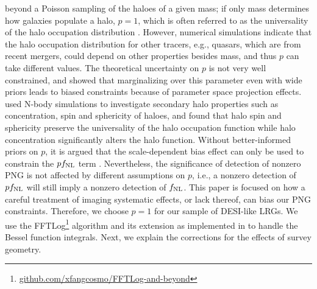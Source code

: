 beyond a Poisson sampling of the haloes of a given mass; if only mass determines how galaxies populate a halo, $p=1$, which is often referred to as the universality of the halo occupation distribution \citep[see, e.g.,][]{slosar2008constraints}. However, numerical simulations indicate that the halo occupation distribution for other tracers, e.g., quasars, which are from recent mergers, could depend on other properties besides mass, and thus $p$ can take different values. The theoretical uncertainty on $p$ is not very well constrained, and \cite{2022JCAP...11..013B} showed that marginalizing over this parameter even with wide priors leads to biased constraints because of parameter space projection effects. \cite{2023JCAP...01..023L} used N-body simulations to investigate secondary halo properties such as concentration, spin and sphericity of haloes, and found that halo spin and sphericity preserve the universality of the halo occupation function while halo concentration significantly alters the halo function. Without better-informed priors on $p$, it is argued that the scale-dependent bias effect can only  be used to constrain the $pf_{\rm NL}$ term \citep[see, e.g.,][]{2020JCAP...12..013B, 2020JCAP...12..031B}. Nevertheless, the significance of detection of nonzero PNG is not affected by different assumptions on $p$, i.e., a nonzero detection of $pf_{\rm NL}$ will still imply a nonzero detection of $f_{\rm NL}$. This paper is focused on how a careful treatment of imaging systematic effects, or lack thereof, can bias our PNG constraints. Therefore, we choose $p=1$ for our sample of DESI-like LRGs. We use the FFTLog\footnote{\href{https://github.com/xfangcosmo/FFTLog-and-beyond}{github.com/xfangcosmo/FFTLog-and-beyond}} algorithm and its extension as implemented in \cite{fang2020beyond} to handle the Bessel function integrals. Next, we explain the corrections for the effects of survey geometry.


